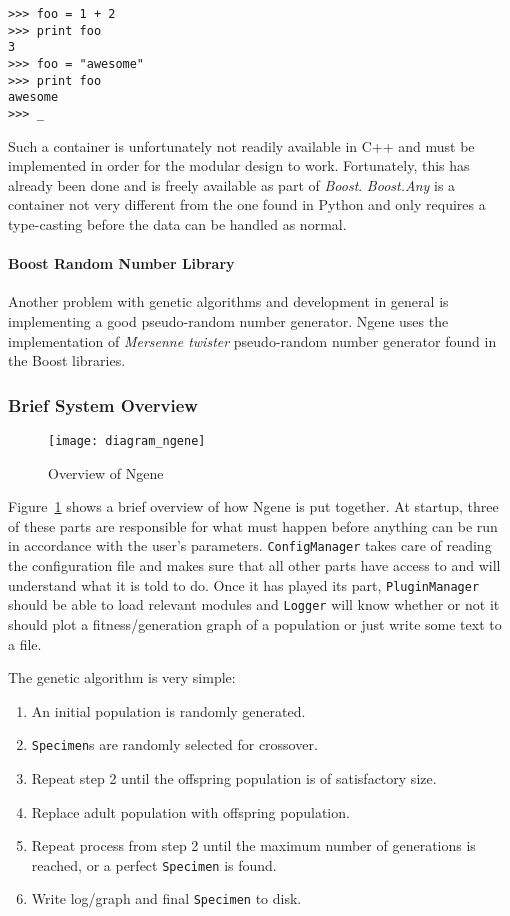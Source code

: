 \begin{verbatim}
>>> foo = 1 + 2
>>> print foo
3
>>> foo = "awesome"
>>> print foo
awesome
>>> _
\end{verbatim}

Such a container is unfortunately not readily available in C++ and must be implemented in order for the modular design to work. Fortunately, this has already been done and is freely available as part of \emph{Boost}. \emph{Boost.Any} is a container not very different from the one found in Python and only requires a type-casting before the data can be handled as normal.

\paragraph{\textbf{Boost Random Number Library}}\cite{maurer2000}
Another problem with genetic algorithms and development in general is implementing a good pseudo-random number generator. Ngene uses the implementation of \emph{Mersenne twister} pseudo-random number generator found in the Boost libraries.

\subsubsection{Brief System Overview}
\begin{figure}[!ht]
	\centering
	\texttt{[image: diagram\_ngene]}
	\caption{Overview of Ngene}
	\label{fig:diagram_ngene}
\end{figure}

Figure~\ref{fig:diagram_ngene} shows a brief overview of how Ngene is put together. At startup, three of these parts are responsible for what must happen before anything can be run in accordance with the user's parameters. \texttt{ConfigManager} takes care of reading the configuration file and makes sure that all other parts have access to and will understand what it is told to do. Once it has played its part, \texttt{PluginManager} should be able to load relevant modules and \texttt{Logger} will know whether or not it should plot a fitness/generation graph of a population or just write some text to a file.

The genetic algorithm is very simple:
\begin{enumerate}
	\itemsep=0pt
	\item An initial population is randomly generated.
	\item \texttt{Specimen}s are randomly selected for crossover.
	\item Repeat step 2 until the offspring population is of satisfactory size.
	\item Replace adult population with offspring population.
	\item Repeat process from step 2 until the maximum number of generations is reached, or a perfect \texttt{Specimen} is found.
	\item Write log/graph and final \texttt{Specimen} to disk.
\end{enumerate}

